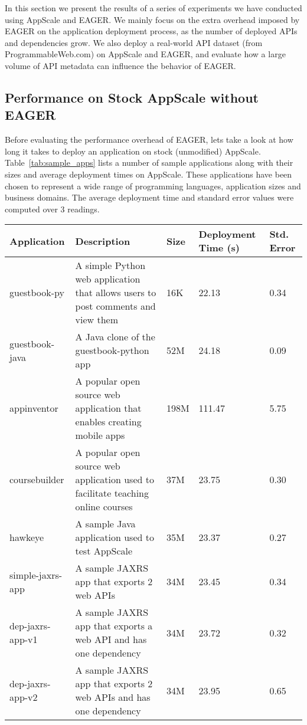 In this section we present the results of a series of experiments we have conducted using AppScale and EAGER. We mainly focus
on the extra overhead imposed by EAGER on the application deployment process, as the number of deployed APIs and dependencies
grow. We also deploy a real-world API dataset (from ProgrammableWeb.com) on AppScale and EAGER, and evaluate how a large 
volume of API metadata can influence the behavior of EAGER.

\subsection{Performance on Stock AppScale without EAGER}
Before evaluating the performance overhead of EAGER, lets take a look at how long it takes to deploy an application on stock (unmodified)
AppScale. Table~\ref{tab:sample_apps} lists a number of sample applications along with their sizes and average deployment times on AppScale.
These applications have been chosen to represent a wide range of programming languages, application sizes and business domains. The average
deployment time and standard error values were computed over 3 readings.

\begin{table*}[ht]
\begin{center}
\begin{tabular}{| l | p{6cm} | l | l | l | }
\hline
Application & Description & Size & Deployment Time (s) & Std. Error\\ \hline
guestbook-py & A simple Python web application that allows users to post comments and view them & 16K & 22.13 & 0.34 \\ \hline
guestbook-java & A Java clone of the guestbook-python app & 52M & 24.18 & 0.09 \\ \hline
appinventor & A popular open source web application that enables creating mobile apps & 198M & 111.47 & 5.75 \\ \hline
coursebuilder & A popular open source web application used to facilitate teaching online courses & 37M & 23.75 & 0.30 \\ \hline
hawkeye & A sample Java application used to test AppScale & 35M & 23.37 & 0.27 \\ \hline
simple-jaxrs-app & A sample JAXRS app that exports 2 web APIs & 34M & 23.45 & 0.34 \\ \hline
dep-jaxrs-app-v1 & A sample JAXRS app that exports a web API and has one dependency & 34M & 23.72 & 0.32 \\ \hline
dep-jaxrs-app-v2 & A sample JAXRS app that exports 2 web APIs and has one dependency & 34M & 23.95 & 0.65 \\ \hline
\end{tabular}
\end{center}
\caption{Sample AppScale Applications}
\label{tab:sample_apps}
\end{table*}


